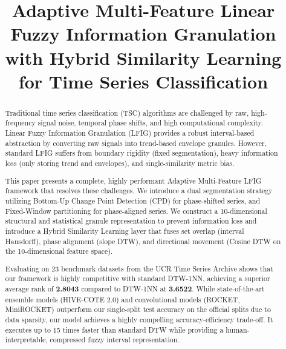 \documentclass[conference]{IEEEtran}
\begin{document}
\title{Adaptive Multi-Feature Linear Fuzzy Information Granulation with Hybrid Similarity Learning for Time Series Classification}

\author{
}

\maketitle

\begin{abstract}
Traditional time series classification (TSC) algorithms are challenged by raw, high-frequency signal noise, temporal phase shifts, and high computational complexity. Linear Fuzzy Information Granulation (LFIG) provides a robust interval-based abstraction by converting raw signals into trend-based envelope granules. However, standard LFIG suffers from boundary rigidity (fixed segmentation), heavy information loss (only storing trend and envelopes), and single-similarity metric bias. 

This paper presents a complete, highly performant Adaptive Multi-Feature LFIG framework that resolves these challenges. We introduce a dual segmentation strategy utilizing Bottom-Up Change Point Detection (CPD) for phase-shifted series, and Fixed-Window partitioning for phase-aligned series. We construct a 10-dimensional structural and statistical granule representation to prevent information loss and introduce a Hybrid Similarity Learning layer that fuses set overlap (interval Hausdorff), phase alignment (slope DTW), and directional movement (Cosine DTW on the 10-dimensional feature space). 

Evaluating on 23 benchmark datasets from the UCR Time Series Archive shows that our framework is highly competitive with standard DTW-1NN, achieving a superior average rank of \textbf{2.8043} compared to DTW-1NN at \textbf{3.6522}. While state-of-the-art ensemble models (HIVE-COTE 2.0) and convolutional models (ROCKET, MiniROCKET) outperform our single-split test accuracy on the official splits due to data sparsity, our model achieves a highly compelling accuracy-efficiency trade-off. It executes up to 15 times faster than standard DTW while providing a human-interpretable, compressed fuzzy interval representation.
\end{abstract}
\end{document}
